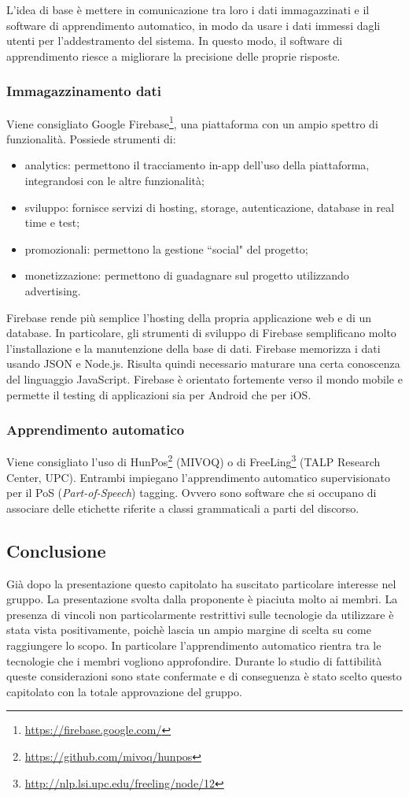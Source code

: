 \documentclass[11pt,a4paper]{article}
\begin{document}
	L'idea di base è mettere in comunicazione tra loro i dati immagazzinati e il software di apprendimento automatico, in modo da usare i dati immessi dagli utenti per l'addestramento del sistema. In questo modo, il software di apprendimento riesce a migliorare la precisione delle proprie risposte.
	\subsubsection{Immagazzinamento dati}
		Viene consigliato Google Firebase\footnote{\url{https://firebase.google.com/}}, una piattaforma con un ampio spettro di funzionalità. Possiede strumenti di:
		\begin{itemize}
			\item analytics: permettono il tracciamento in-app dell'uso della piattaforma, integrandosi con le altre funzionalità;
			\item sviluppo: fornisce servizi di hosting, storage, autenticazione, database in real time e test; 
			\item promozionali: permettono la gestione ``social" del progetto;
			\item monetizzazione: permettono di guadagnare sul progetto utilizzando advertising.
		\end{itemize}	 
	
		Firebase rende più semplice l'hosting della propria applicazione web e di un database. In particolare, gli strumenti di sviluppo di Firebase semplificano molto l'installazione e la manutenzione della base di dati. Firebase memorizza i dati usando JSON e Node.js. Risulta quindi necessario maturare una certa conoscenza del linguaggio JavaScript.
	Firebase è orientato fortemente verso il mondo mobile e permette il testing di applicazioni sia per Android che per iOS.
	
	\subsubsection{Apprendimento automatico}
		Viene consigliato l'uso di HunPos\footnote{\url{https://github.com/mivoq/hunpos}} (MIVOQ) o di FreeLing\footnote{\url{ http://nlp.lsi.upc.edu/freeling/node/12}} (TALP Research Center, UPC). Entrambi impiegano l'apprendimento automatico supervisionato per il PoS (\textit{Part-of-Speech}) tagging. Ovvero sono software che si occupano di associare delle etichette riferite a classi grammaticali a parti del discorso. 
		\subsection{Conclusione}
		Già dopo la presentazione questo capitolato ha suscitato particolare interesse nel gruppo. La presentazione svolta dalla proponente è piaciuta molto ai membri. La presenza di vincoli non particolarmente restrittivi sulle tecnologie da utilizzare è stata vista positivamente, poichè lascia un ampio margine di scelta su come raggiungere lo scopo. In particolare l'apprendimento automatico rientra tra le tecnologie che i membri vogliono approfondire. Durante lo studio di fattibilità queste considerazioni sono state confermate e di conseguenza è stato scelto questo capitolato con la totale approvazione del gruppo. 
		\newpage
\end{document}
